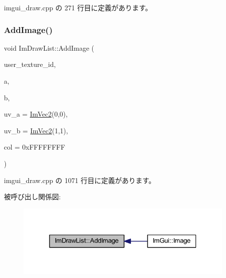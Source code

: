  imgui\+\_\+draw.\+cpp の 271 行目に定義があります。

\mbox{\label{struct_im_draw_list_ac37cd998bf5f40705c7445004a029b66}} 
\subsubsection{\texorpdfstring{Add\+Image()}{AddImage()}}
{\footnotesize\ttfamily void Im\+Draw\+List\+::\+Add\+Image (\begin{DoxyParamCaption}\item[{\mbox{\hyperlink{imgui_8h_a364f4447ecbc4ca176145ccff9db6286}{Im\+Texture\+ID}}}]{user\+\_\+texture\+\_\+id,  }\item[{const \mbox{\hyperlink{struct_im_vec2}{Im\+Vec2}} \&}]{a,  }\item[{const \mbox{\hyperlink{struct_im_vec2}{Im\+Vec2}} \&}]{b,  }\item[{const \mbox{\hyperlink{struct_im_vec2}{Im\+Vec2}} \&}]{uv\+\_\+a = {\ttfamily \mbox{\hyperlink{struct_im_vec2}{Im\+Vec2}}(0,0)},  }\item[{const \mbox{\hyperlink{struct_im_vec2}{Im\+Vec2}} \&}]{uv\+\_\+b = {\ttfamily \mbox{\hyperlink{struct_im_vec2}{Im\+Vec2}}(1,1)},  }\item[{\mbox{\hyperlink{imgui_8h_a118cff4eeb8d00e7d07ce3d6460eed36}{Im\+U32}}}]{col = {\ttfamily 0xFFFFFFFF} }\end{DoxyParamCaption})}



 imgui\+\_\+draw.\+cpp の 1071 行目に定義があります。

被呼び出し関係図\+:\nopagebreak
\begin{figure}[H]
\begin{center}
\leavevmode
\includegraphics[width=304pt]{struct_im_draw_list_ac37cd998bf5f40705c7445004a029b66_icgraph}
\end{center}
\end{figure}
\mbox{\label{struct_im_draw_list_a1cc1f8d4d1812c65c7887b8d5aef31fe}} 
